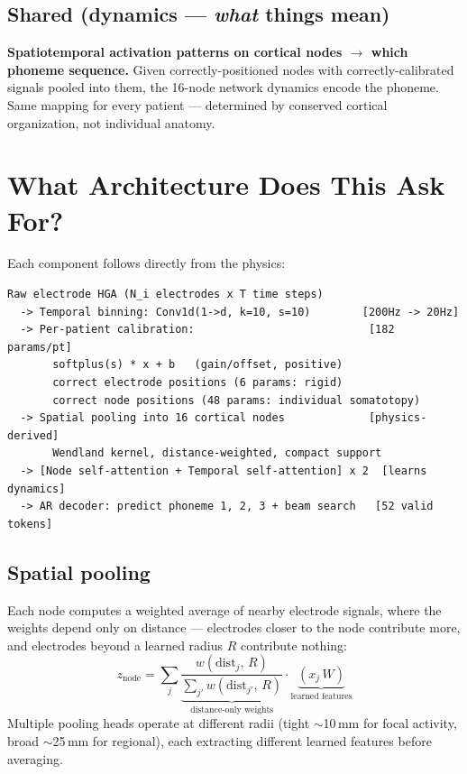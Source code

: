 \documentclass[11pt,letterpaper]{article}
\begin{document}
\subsection*{Shared (dynamics --- \textit{what} things mean)}

\textbf{Spatiotemporal activation patterns on cortical nodes $\to$ which phoneme sequence.} Given correctly-positioned nodes with correctly-calibrated signals pooled into them, the 16-node network dynamics encode the phoneme. Same mapping for every patient --- determined by conserved cortical organization, not individual anatomy.


\section{What Architecture Does This Ask For?}

Each component follows directly from the physics:

\begin{Verbatim}[frame=single, fontsize=\small]
Raw electrode HGA (N_i electrodes x T time steps)
  -> Temporal binning: Conv1d(1->d, k=10, s=10)        [200Hz -> 20Hz]
  -> Per-patient calibration:                           [182 params/pt]
       softplus(s) * x + b   (gain/offset, positive)
       correct electrode positions (6 params: rigid)
       correct node positions (48 params: individual somatotopy)
  -> Spatial pooling into 16 cortical nodes             [physics-derived]
       Wendland kernel, distance-weighted, compact support
  -> [Node self-attention + Temporal self-attention] x 2  [learns dynamics]
  -> AR decoder: predict phoneme 1, 2, 3 + beam search   [52 valid tokens]
\end{Verbatim}

\subsection*{Spatial pooling}

Each node computes a weighted average of nearby electrode signals, where the weights depend only on distance --- electrodes closer to the node contribute more, and electrodes beyond a learned radius $R$ contribute nothing:
\begin{equation}
z_{\text{node}} = \sum_{j} \underbrace{\frac{w(\text{dist}_{j},\, R)}{\sum_{j'} w(\text{dist}_{j'},\, R)}}_{\text{distance-only weights}} \cdot \underbrace{(x_j\, W)}_{\text{learned features}}
\end{equation}
Multiple pooling heads operate at different radii (tight ${\sim}$10\,mm for focal activity, broad ${\sim}$25\,mm for regional), each extracting different learned features before averaging.
\end{document}
